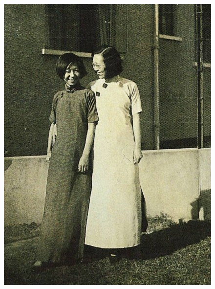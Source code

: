 \begin{figure}[htb]
    \centering %
    \includegraphics[scale=0.35]{picture/对照记20.jpeg}

\end{figure}
